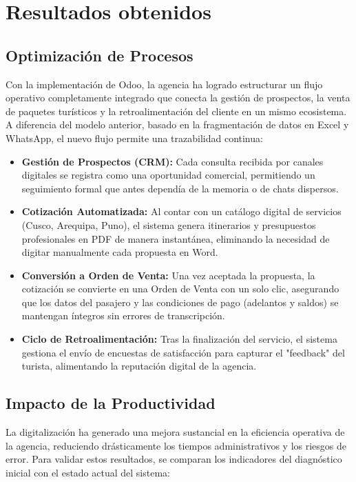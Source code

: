 \section{Resultados obtenidos}

\subsection{Optimización de Procesos}

Con la implementación de Odoo, la agencia ha logrado estructurar un flujo operativo completamente integrado que conecta la gestión de prospectos, la venta de paquetes turísticos y la retroalimentación del cliente en un mismo ecosistema. A diferencia del modelo anterior, basado en la fragmentación de datos en Excel y WhatsApp, el nuevo flujo permite una trazabilidad continua:

\begin{itemize}
    \item \textbf{Gestión de Prospectos (CRM):} Cada consulta recibida por canales digitales se registra como una oportunidad comercial, permitiendo un seguimiento formal que antes dependía de la memoria o de chats dispersos.
    \item \textbf{Cotización Automatizada:} Al contar con un catálogo digital de servicios (Cusco, Arequipa, Puno), el sistema genera itinerarios y presupuestos profesionales en PDF de manera instantánea, eliminando la necesidad de digitar manualmente cada propuesta en Word.
    \item \textbf{Conversión a Orden de Venta:} Una vez aceptada la propuesta, la cotización se convierte en una Orden de Venta con un solo clic, asegurando que los datos del pasajero y las condiciones de pago (adelantos y saldos) se mantengan íntegros sin errores de transcripción.
    \item \textbf{Ciclo de Retroalimentación:} Tras la finalización del servicio, el sistema gestiona el envío de encuestas de satisfacción para capturar el "feedback" del turista, alimentando la reputación digital de la agencia.
\end{itemize}

\subsection{Impacto de la Productividad}

La digitalización ha generado una mejora sustancial en la eficiencia operativa de la agencia, reduciendo drásticamente los tiempos administrativos y los riesgos de error. Para validar estos resultados, se comparan los indicadores del diagnóstico inicial con el estado actual del sistema:

